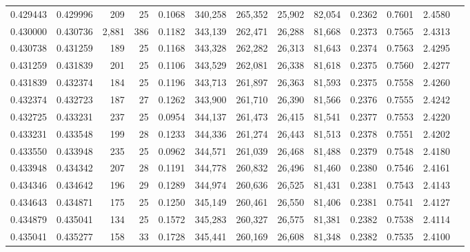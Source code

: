 \begin{tabular}{rrrrrrrrrrrrr}
0.429443 & 0.429996 &   209 &  25 &                                     0.1068 & 340,258 & 265,352 &  25,902 &  82,054 & 0.2362 & 0.7601 & 2.4580 \\
0.430000 & 0.430736 & 2,881 & 386 &                                     0.1182 & 343,139 & 262,471 &  26,288 &  81,668 & 0.2373 & 0.7565 & 2.4313 \\
0.430738 & 0.431259 &   189 &  25 &                                     0.1168 & 343,328 & 262,282 &  26,313 &  81,643 & 0.2374 & 0.7563 & 2.4295 \\
0.431259 & 0.431839 &   201 &  25 &                                     0.1106 & 343,529 & 262,081 &  26,338 &  81,618 & 0.2375 & 0.7560 & 2.4277 \\
0.431839 & 0.432374 &   184 &  25 &                                     0.1196 & 343,713 & 261,897 &  26,363 &  81,593 & 0.2375 & 0.7558 & 2.4260 \\
0.432374 & 0.432723 &   187 &  27 &                                     0.1262 & 343,900 & 261,710 &  26,390 &  81,566 & 0.2376 & 0.7555 & 2.4242 \\
0.432725 & 0.433231 &   237 &  25 &                                     0.0954 & 344,137 & 261,473 &  26,415 &  81,541 & 0.2377 & 0.7553 & 2.4220 \\
0.433231 & 0.433548 &   199 &  28 &                                     0.1233 & 344,336 & 261,274 &  26,443 &  81,513 & 0.2378 & 0.7551 & 2.4202 \\
0.433550 & 0.433948 &   235 &  25 &                                     0.0962 & 344,571 & 261,039 &  26,468 &  81,488 & 0.2379 & 0.7548 & 2.4180 \\
0.433948 & 0.434342 &   207 &  28 &                                     0.1191 & 344,778 & 260,832 &  26,496 &  81,460 & 0.2380 & 0.7546 & 2.4161 \\
0.434346 & 0.434642 &   196 &  29 &                                     0.1289 & 344,974 & 260,636 &  26,525 &  81,431 & 0.2381 & 0.7543 & 2.4143 \\
0.434643 & 0.434871 &   175 &  25 &                                     0.1250 & 345,149 & 260,461 &  26,550 &  81,406 & 0.2381 & 0.7541 & 2.4127 \\
0.434879 & 0.435041 &   134 &  25 &                                     0.1572 & 345,283 & 260,327 &  26,575 &  81,381 & 0.2382 & 0.7538 & 2.4114 \\
0.435041 & 0.435277 &   158 &  33 &                                     0.1728 & 345,441 & 260,169 &  26,608 &  81,348 & 0.2382 & 0.7535 & 2.4100 \\

\end{tabular}
